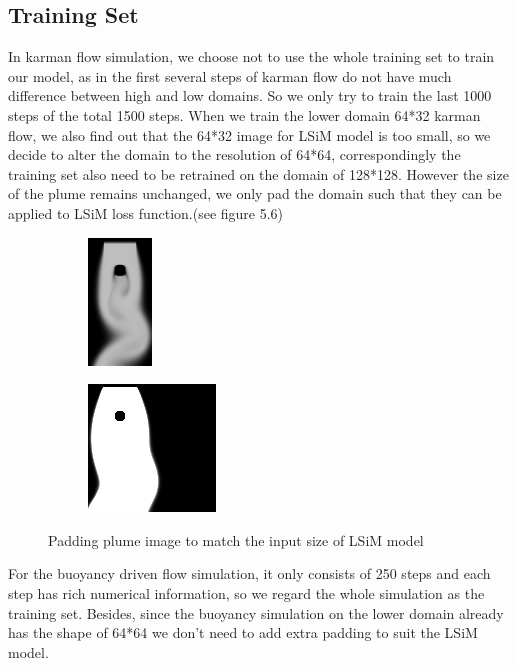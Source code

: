 \documentclass[a4paper,12pt,twoside]{report}
\begin{document}
\subsection{Training Set}
In karman flow simulation, we choose not to use the whole training set to train our model, as in the first several steps of karman flow do not have much difference between high and low domains. So we only try to train the last 1000 steps of the total 1500 steps. When we train the lower domain 64*32 karman flow, we also find out that the 64*32 image for LSiM model is too small, so we decide to alter the domain to the resolution of 64*64, correspondingly the training set also need to be retrained on the domain of 128*128. However the size of the plume remains unchanged, we only pad the domain such that they can be applied to LSiM loss function.(see figure 5.6)
\begin{figure}
\centering
\begin{subfigure}{0.4\textwidth}
  \centering
  \includegraphics[scale=1]{nonpad_karmanflow.png}
  \caption{}
\end{subfigure}
\begin{subfigure}{0.4\textwidth}
  \centering
  \includegraphics[scale=1]{pad_karmanflow.png}
  \caption{}
\end{subfigure}
\caption{Padding plume image to match the input size of LSiM model}
\end{figure}
For the buoyancy driven flow simulation, it only consists of 250 steps and each step has rich numerical information, so we regard the whole simulation as the training set. Besides, since the buoyancy simulation on the lower domain already has the shape of 64*64 we don't need to add extra padding to suit the LSiM model.
\end{document}
